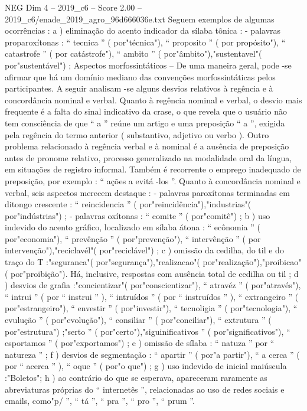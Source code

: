\begin{textsample}{NEG Dim 4 – 2019\_c6 – Score 2.00 – 2019\_c6/enade\_2019\_agro\_96d666036e.txt}
Seguem exemplos de algumas ocorrências : a ) eliminação do acento indicador da sílaba tônica : - palavras proparoxítonas : “ tecnica ” ( por"técnica"), “ proposito ” ( por propósito"), “ catastrofe ” ( por catástrofe"), “ ambito ” ( por"âmbito"),"sustentavel"( por"sustentável") ; Aspectos morfossintáticos – De uma maneira geral, pode -se afirmar que há um domínio mediano das convenções morfossintáticas pelos participantes.
A seguir analisam -se alguns desvios relativos à regência e à concordância nominal e verbal.
Quanto à regência nominal e verbal, o desvio mais frequente é a falta do sinal indicativo da crase, o que revela que o usuário não tem consciência de que “ a ” reúne um artigo e uma preposição “ a ”, exigida pela regência do termo anterior ( substantivo, adjetivo ou verbo ).
Outro problema relacionado à regência verbal e à nominal é a ausência de preposição antes de pronome relativo, processo generalizado na modalidade oral da língua, em situações de registro informal.
Também é recorrente o emprego inadequado de preposição, por exemplo : “ ações a evitá -los ”.
Quanto à concordância nominal e verbal, seis aspectos merecem destaque : - palavras paroxítonas terminadas em ditongo crescente : “ reincidencia ” ( por"reincidência"),"industrias"( por"indústrias") ; - palavras oxítonas : “ comite ” ( por"comitê") ; b ) uso indevido do acento gráfico, localizado em sílaba átona : “ ecônomia ” ( por"economia"), “ prevênção ” ( por"prevenção"), “ intervênção ” ( por intervenção"),"reciclavél"( por"reciclável") ; c ) omissão da cedilha, do til e do traço do T :"seguranca"( por"segurança"),"realizacao"( por"realização"),"proibicao"( por"proibição").
Há, inclusive, respostas com ausência total de cedilha ou til ; d ) desvios de grafia :"concientizar"( por"conscientizar"), “ atravéz ” ( por"através"), “ intrui ” ( por “ instrui ” ), “ intruídos ” ( por “ instruídos ” ), “ extrangeiro ” ( por"estrangeiro"), “ envestir ” ( por"investir"), “ tecnoligia ” ( por"tecnologia"), “ evulução ” ( por"evolução"), “ consiliar ” ( por"conciliar"), “ extrutura ” ( por"estrutura") ;"serto ” ( por"certo"),"siguinificativos ” ( por"significativos"), “ esportamos ” ( por"exportamos") ; e ) omissão de sílaba : “ natuza ” por “ natureza ” ; f ) desvios de segmentação : “ apartir ” ( por"a partir"), “ a cerca ” ( por “ acerca ” ), “ oque ” ( por"o que") ; g ) uso indevido de inicial maiúscula :"Boletos"; h ) ao contrário do que se esperava, apareceram raramente as abreviaturas próprias do “ internetês ”, relacionadas ao uso de redes sociais e emails, como"p/ ”, “ tá ”, “ pra ”, “ pro ”, “ prum ”.

\end{textsample}
